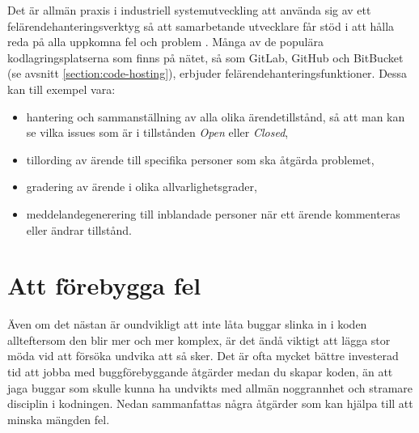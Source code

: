 Det är allmän praxis i industriell systemutveckling att använda sig av ett felärendehanteringsverktyg  så att samarbetande utvecklare får stöd i att hålla reda på alla uppkomna fel och problem . Många av de populära kodlagringsplatserna som finns på nätet, så som GitLab, GitHub och BitBucket (se avsnitt \ref{section:code-hosting}), erbjuder felärendehanteringsfunktioner. Dessa kan till exempel vara:
\begin{itemize}
\item hantering och sammanställning av alla olika ärendetillstånd, så att man kan se vilka issues som är i tillstånden \textit{Open} eller \textit{Closed},
\item tillording av ärende till specifika personer som ska åtgärda problemet,
\item gradering av ärende i olika allvarlighetsgrader,
\item meddelandegenerering till inblandade personer när ett ärende kommenteras eller ändrar tillstånd.
\end{itemize}


\section{Att förebygga fel}

Även om det nästan är oundvikligt att inte låta buggar slinka in i koden allteftersom den blir mer och mer komplex, är det ändå viktigt att lägga stor möda vid att försöka undvika att så sker. Det är ofta mycket bättre investerad tid att jobba med buggförebyggande åtgärder medan du skapar koden, än att jaga buggar som skulle kunna ha undvikts med allmän noggrannhet och stramare disciplin i kodningen. Nedan sammanfattas några åtgärder som kan hjälpa till att minska mängden fel.

